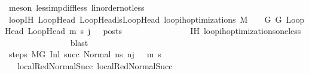 \begin{isabellebody}
\ {\isacharparenleft}{\kern0pt}meson\ less{\isacharunderscore}{\kern0pt}imp{\isacharunderscore}{\kern0pt}diff{\isacharunderscore}{\kern0pt}less\ linorder{\isacharunderscore}{\kern0pt}not{\isacharunderscore}{\kern0pt}less{\isacharparenright}{\kern0pt}\isanewline
\ \ \isanewline
\ \ \ \ \ \ \ \ \ \ \ \ \isamarkupfalse%
\ loopIH{\isacharcolon}{\kern0pt}\ {\isachardoublequoteopen}{\isasymforall}{\isacharparenleft}{\kern0pt}LoopHead{\isacharcomma}{\kern0pt}\ LoopHead{\isacharprime}{\kern0pt}{\isacharparenright}{\kern0pt}{\isasymin}lsLoopHead{\isachardot}{\kern0pt}\ loop{\isacharunderscore}{\kern0pt}ih{\isacharunderscore}{\kern0pt}optimizations\ M\ {\isasymLambda}\ {\isasymGamma}\ {\isasymOmega}\ G\ G{\isacharprime}{\kern0pt}\ LoopHead\ LoopHead{\isacharprime}{\kern0pt}\ m{\isacharprime}{\kern0pt}\ s{\isacharprime}{\kern0pt}\ {\isacharparenleft}{\kern0pt}j\ {\isacharminus}{\kern0pt}\ {}{\isacharparenright}{\kern0pt}\ posts{\isachardoublequoteclose}\isanewline
\ \ \ \ \ \ \ \ \ \ \ \ \ \ \isamarkupfalse%
\ IH\ loop{\isacharunderscore}{\kern0pt}ih{\isacharunderscore}{\kern0pt}optimizations{\isacharunderscore}{\kern0pt}one{\isacharunderscore}{\kern0pt}less\isanewline
\ \ \ \ \ \ \ \ \ \ \ \ \ \ \isamarkupfalse%
\ blast\isanewline
\ \ \isanewline
\ \ \ \ \ \ \ \ \ \ \ \ \isamarkupfalse%
\ steps{\isacharcolon}{\kern0pt}\ {\isachardoublequoteopen}M{\isacharcomma}{\kern0pt}{\isasymLambda}{\isacharcomma}{\kern0pt}{\isasymGamma}{\isacharcomma}{\kern0pt}{\isasymOmega}{\isacharcomma}{\kern0pt}G\ {\isasymturnstile}{\isacharparenleft}{\kern0pt}Inl\ succ{\isacharcomma}{\kern0pt}\ Normal\ ns{\isacharprime}{\kern0pt}{\isacharparenright}{\kern0pt}\ {\isacharminus}{\kern0pt}n{\isasymrightarrow}{\isacharcircum}{\kern0pt}{\isacharparenleft}{\kern0pt}j\ {\isacharminus}{\kern0pt}\ {}{\isacharparenright}{\kern0pt}\ {\isacharparenleft}{\kern0pt}m{\isacharprime}{\kern0pt}{\isacharcomma}{\kern0pt}\ s{\isacharprime}{\kern0pt}{\isacharparenright}{\kern0pt}{\isachardoublequoteclose}\isanewline
\ \ \ \ \ \ \ \ \ \ \ \ \ \ \isamarkupfalse%
\ {\isachardoublequoteopen}{}{\isachardoublequoteclose}{\isacharparenleft}{\kern0pt}{}{\isacharparenright}{\kern0pt}\ {\isachardoublequoteopen}{}{\isachardoublequoteclose}{\isacharparenleft}{\kern0pt}{}{\isacharparenright}{\kern0pt}\ local{\isachardot}{\kern0pt}RedNormalSucc{\isacharparenleft}{\kern0pt}{}{\isacharparenright}{\kern0pt}\ local{\isachardot}{\kern0pt}RedNormalSucc{\isacharparenleft}{\kern0pt}{}{\isacharparenright}{\kern0pt}\ \isamarkupfalse%

\end{isabellebody}
